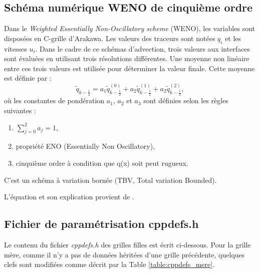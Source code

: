 \documentclass[10pt,a4paper,titlepage]{article}
\begin{document}
\subsection{Schéma numérique WENO de cinquième ordre}
\label{anx:WENO}
Dans le \textit{Weighted Essentially Non-Oscillatory scheme} (WENO), les variables sont disposées en C-grille d'Arakawa.
Les valeurs des traceurs sont notées $q_i$ et les vitesses $u_i$.
Dans le cadre de ce schémas d'advection, trois valeurs aux interfaces sont évaluées en utilisant trois résolutions différentes.
Une moyenne non linéaire entre ces trois valeurs est utilisée pour déterminer la valeur finale.
Cette moyenne est définie par :
$$\tilde{q}_{k-\frac{1}{2}} = a_1\tilde{q}^{(0)}_{k-\frac{1}{2}} + a_2\tilde{q}^{(1)}_{k-\frac{1}{2}} + a_2\tilde{q}^{(2)}_{k-\frac{1}{2}},$$
où les constantes de pondération $a_1$, $a_2$ et $a_3$ sont définies selon les règles suivantes :
\begin{enumerate}
    \item $\sum_{j=0}^{2}a_j = 1$,
    \item propriété ENO (Essentially Non Oscillatory),
    \item cinquième ordre à condition que q(x) soit peut rugueux.
\end{enumerate}
C'est un schéma à variation bornée (TBV, Total variation Bounded).

L'équation et son explication provient de \cite{schemas_advection}.


\subsection{Fichier de paramétrisation cppdefs.h}
\label{anx:cppdefs}
Le contenu du fichier \textit{cppdefs.h} des grilles filles est écrit ci-dessous. Pour la grille mère, comme il n'y a pas de données héritées d'une grille précédente, quelques clefs sont modifiées comme décrit par la Table \ref{table:cppdefs_mere}.
\end{document}
